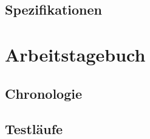 \documentclass{article}
\begin{document}
\subsection{Spezifikationen}


\newpage
\section{Arbeitstagebuch}\label{section-diary}

\subsection{Chronologie}
\subsection{Testläufe}


\end{document}
